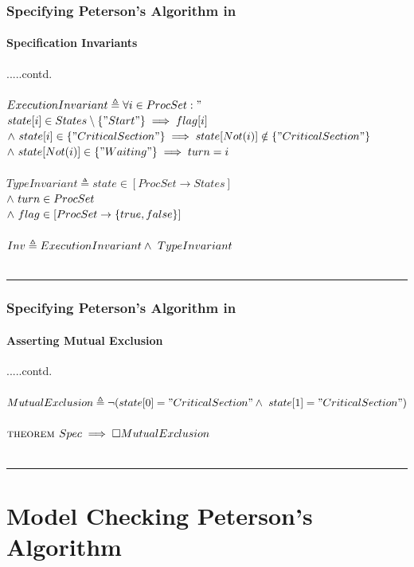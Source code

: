 \documentclass[xcolor=dvipsnames]{beamer}
\begin{document}
\begin{frame}
	\frametitle{Specifying Peterson's Algorithm in \tla}
	\framesubtitle{Specification Invariants}
	\fontsize{8}{7.2}\selectfont
	
	.....contd. \\~\\
	$ ExecutionInvariant \triangleq \forall i \in ProcSet:"$ \\
	\hspace*{0.8cm}$state[i] \in States \setminus  \{"Start"\} \implies flag[i] $\\
	\hspace*{0.8cm}$\land \   state[i] \in \{"CriticalSection"\} \implies state[Not(i)] \notin \{"CriticalSection"\}$\\
	\hspace*{0.8cm}$\land \  state[Not(i)] \in \{"Waiting"\} \implies turn = i$\\~\\
	$ TypeInvariant \triangleq state \in [ProcSet \rightarrow States]$ \\
	\hspace*{0.8cm}$\land \  turn \in ProcSet$\\
	\hspace*{0.8cm}$\land \  flag \in [ProcSet \rightarrow \{true, false\}]$\\~\\
	$Inv \triangleq ExecutionInvariant \land \  TypeInvariant$\\~\\ 
	
	\hrule
	
\end{frame}

\begin{frame}
	\frametitle{Specifying Peterson's Algorithm in \tla}
	\framesubtitle{Asserting Mutual Exclusion}
	\fontsize{8}{7.2}\selectfont
	
	.....contd. \\~\\
$MutualExclusion \triangleq \lnot(state[0] = "CriticalSection" \land \  state[1] = "CriticalSection")$\\~\\
$\textsc{theorem } Spec \implies \square MutualExclusion$\\~\\
	\hrule
\end{frame}
\section{Model Checking Peterson's Algorithm}
\end{document}
